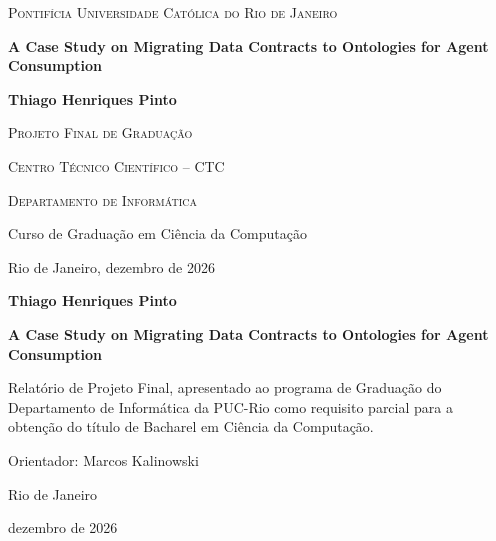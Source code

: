 \documentclass[11pt,a4paper,oneside]{report}
\newcommand{\thesistitle}{A Case Study on Migrating Data Contracts to Ontologies for Agent Consumption}
\newcommand{\thesisauthor}{Thiago Henriques Pinto}
\newcommand{\thesisadvisor}{Marcos Kalinowski}
\newcommand{\thesisdate}{dezembro de 2026}
\begin{document}

\begin{titlepage}
\begin{flushright}
{\scshape Pontif\'icia Universidade Cat\'olica do Rio de Janeiro}\par
\vspace{5cm}
{\LARGE\bfseries \thesistitle\par}
\vspace{3cm}
{\Large\bfseries \thesisauthor\par}
\vspace{3cm}
{\scshape Projeto Final de Gradua\c{c}\~ao}\par
\vspace{3cm}
{\scshape Centro T\'ecnico Cient\'ifico -- CTC}\par
{\scshape Departamento de Inform\'atica}\par
Curso de Gradua\c{c}\~ao em Ci\^encia da Computa\c{c}\~ao\par
\vfill
Rio de Janeiro, \thesisdate
\end{flushright}
\end{titlepage}

\begin{flushright}
\vspace*{2cm}
\vspace{3cm}
{\large\bfseries \thesisauthor\par}
\vspace{4cm}
{\Large\bfseries \thesistitle\par}
\vspace{3cm}
\begin{minipage}{0.62\textwidth}
\begin{singlespace}
Relat\'orio de Projeto Final, apresentado ao programa de Gradua\c{c}\~ao do
Departamento de Inform\'atica da PUC-Rio como requisito parcial para a
obten\c{c}\~ao do t\'itulo de Bacharel em Ci\^encia da Computa\c{c}\~ao.
\end{singlespace}
\end{minipage}\par
\vspace{2cm}
Orientador: \thesisadvisor\par
\vfill
Rio de Janeiro\par \thesisdate
\end{flushright}
\clearpage
\end{document}
